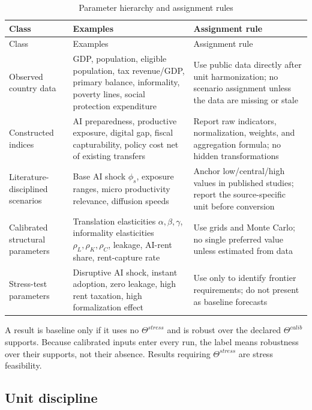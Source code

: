 \documentclass[11pt,a4paper]{article}
\begin{document}
\begin{longtable}{p{}p{}p{}}
\caption{Parameter hierarchy and assignment rules}\label{tab:parameter_hierarchy}\\
\toprule
Class & Examples & Assignment rule \\
\midrule
\endfirsthead
\toprule
Class & Examples & Assignment rule \\
\midrule
\endhead
Observed country data & GDP, population, eligible population, tax revenue/GDP, primary balance, informality, poverty lines, social protection expenditure & Use public data directly after unit harmonization; no scenario assignment unless the data are missing or stale \\
Constructed indices & AI preparedness, productive exposure, digital gap, fiscal capturability, policy cost net of existing transfers & Report raw indicators, normalization, weights, and aggregation formula; no hidden transformations \\
Literature-disciplined scenarios & Base AI shock $\phi_s$, exposure ranges, micro productivity relevance, diffusion speeds & Anchor low/central/high values in published studies; report the source-specific unit before conversion \\
Calibrated structural parameters & Translation elasticities $\alpha,\beta,\gamma$, informality elasticities $\rho_L,\rho_K,\rho_C$, leakage, AI-rent share, rent-capture rate & Use grids and Monte Carlo; no single preferred value unless estimated from data \\
Stress-test parameters & Disruptive AI shock, instant adoption, zero leakage, high rent taxation, high formalization effect & Use only to identify frontier requirements; do not present as baseline forecasts \\
\bottomrule
\end{longtable}

A result is baseline only if it uses no $\Theta^{stress}$ and is robust over the declared $\Theta^{calib}$ supports. Because calibrated inputs enter every run, the label means robustness over their supports, not their absence. Results requiring $\Theta^{stress}$ are stress feasibility.

\subsection{Unit discipline}
\end{document}
